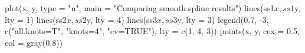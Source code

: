 \begin{Schunk}
\begin{Sinput}
 plot(x, y, type = "n", main = "Comparing smooth.spline results")
 lines(ss1$x, ss1$y, lty = 1)
 lines(ss2$x, ss2$y, lty = 4)
 lines(ss3$x, ss3$y, lty = 3)
 legend(0.7, -3, c("all.knots=T", "knots=4", "cv=TRUE"), lty = c(1, 4, 3))
 points(x, y, cex = 0.5, col = gray(0.8))
\end{Sinput}
\end{Schunk}
